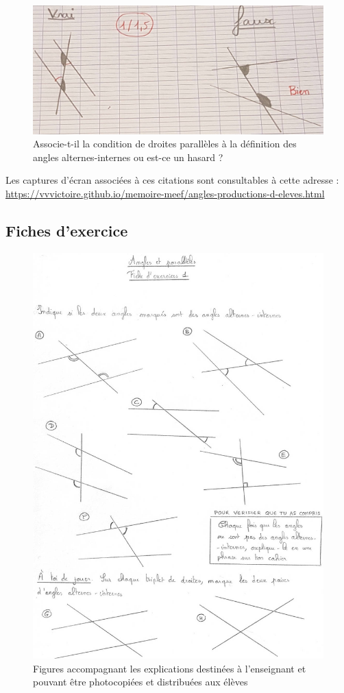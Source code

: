 \begin{figure}[h!]
    \centering
    \includegraphics[width=0.6\linewidth]{img/anglesquestion.jpg}
    \caption{Associe-t-il la condition de droites parallèles à la définition des angles alternes-internes ou est-ce un hasard ?}
\end{figure}

Les captures d'écran associées à ces citations sont consultables à cette adresse : \url{https://vvvictoire.github.io/memoire-meef/angles-productions-d-eleves.html}

\clearpage

\subsection{Fiches d'exercice}\label{annexe:angles-fiches}

\begin{figure}[h!]
    \centering
    \includegraphics[width=0.6\linewidth]{img/anglesfiche1.jpg}
    \caption{Figures accompagnant les explications destinées à l'enseignant et pouvant être photocopiées et distribuées aux élèves}
    \label{fig:angles-fiche1}
\end{figure}

